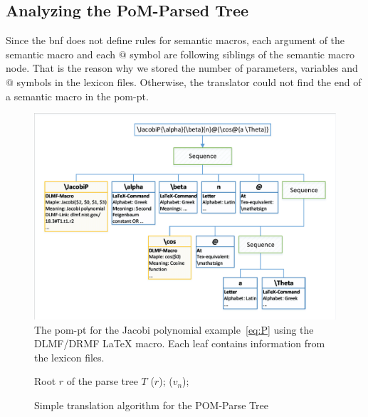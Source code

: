 \documentclass[a4paper,11pt]{article}
\theoremstyle{defTheoStyle}
\theoremstyle{defExampStyle}
\begin{document}
\subsection{Analyzing the PoM-Parsed Tree}\label{subsec:analyze-mlp}
Since the \gls*{bnf} does not define rules for semantic macros, each argument of the semantic macro and each $@$ symbol are following siblings of the semantic macro node. That is the reason why we stored the number of parameters, variables and $@$ symbols in the lexicon files. Otherwise, the translator could not find the end of a semantic macro in the \gls*{pom-pt}.

\begin{figure}[ht]
	\centering
	\includegraphics[clip, trim=0.2cm 0.2cm 0.2cm 0.2cm, scale=0.75]{SyntaxTreeUseCase.pdf}
	\caption{The \gls*{pom-pt} for the Jacobi polynomial example~\eqref{eq:P} using the DLMF/DRMF \LaTeX{} macro. Each leaf contains information from the lexicon files.}
	\label{fig:syntax-tree-usecase}
	\vspace{-10pt}
\end{figure}

\begin{figure}
\vspace{-20pt}
\begin{minipage}{0.5\textwidth}
\begin{algorithm}[H]
\caption{Simple translation algorithm for the POM-Parse Tree}\label{alg:simple-translation}
	\begin{algorithmic}[1]
	\Require Root $r$ of the parse tree $T$
		($r$);
	\Else
			($v_n$);
		\EndFor
	\EndIf
	\EndProcedure
	\end{algorithmic}
\end{algorithm}
\end{minipage}
\vspace{-14pt}
\end{figure}
\end{document}
